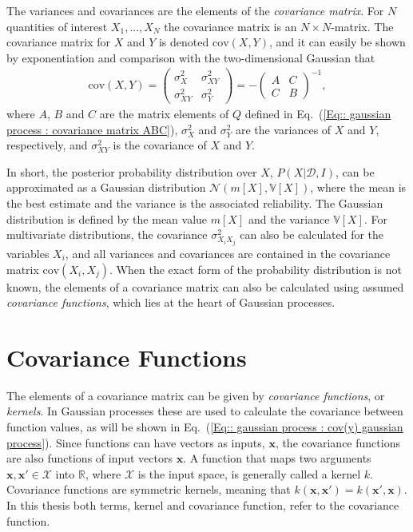 \documentclass[twoside,english]{uiofysmaster}
\begin{document}
{{The variances and covariances are the elements of the \textit{covariance matrix}. For $N$ quantities of interest $X_1, ...,X_N$ the covariance matrix is an $N \times N$-matrix. The covariance matrix for $X$ and $Y$ is denoted $\text{cov}(X,Y)$, and it can easily be shown by exponentiation and comparison with the two-dimensional Gaussian that \cite{sivia2006data}
\begin{align}
\text{cov}(X,Y) = 
\begin{pmatrix}
\sigma_X^2 & \sigma_{XY}^2\\
\sigma_{XY}^2 & \sigma_Y^2
\end{pmatrix}
= - \begin{pmatrix}
A & C\\
C & B
\end{pmatrix}^{-1},
\end{align}
where $A$, $B$ and $C$ are the matrix elements of $Q$ defined in Eq.~(\ref{Eq:: gaussian process : covariance matrix ABC}),  $\sigma_X^2$ and $\sigma_Y^2$ are the variances of $X$ and $Y$, respectively, and $\sigma_{XY}^2$ is the covariance of $X$ and $Y$.

In short, the posterior probability distribution over $X$, $P(X | \mathcal{D}, I)$, can be approximated as a Gaussian distribution $\mathcal{N}(m[X], \mathbb{V}[X])$, where the mean is the best estimate and the variance is the associated reliability. The Gaussian distribution is defined by the mean value $m[X]$ and the variance $\mathbb{V}[X]$. For multivariate distributions, the covariance $\sigma_{X_i X_j}^2$ can also be calculated for the variables $X_i$, and all variances and covariances are contained in the covariance matrix $\text{cov}(X_i, X_j)$. When the exact form of the probability distribution is not known, the elements of a covariance matrix can also be calculated using assumed \textit{covariance functions}, which lies at the heart of Gaussian processes.



\section{Covariance Functions}\label{Sec:: gaussian processes : Covariance functions}


The elements of a covariance matrix can be given by \textit{covariance functions}, or \textit{kernels}. In Gaussian processes these are used to calculate the covariance between function values, as will be shown in Eq.~(\ref{Eq:: gaussian process : cov(y) gaussian process}). Since functions can have vectors as inputs, $\textbf{x}$, the covariance functions are also functions of input vectors $\textbf{x}$. A function that maps two arguments $\textbf{x},\textbf{x}' \in \mathcal{X}$ into $\mathbb{R}$, where $\mathcal{X}$ is the input space, is generally called a kernel $k$. Covariance functions are symmetric kernels, meaning that $k(\textbf{x}, \textbf{x}') = k(\textbf{x}', \textbf{x})$. In this thesis both terms, kernel and covariance function, refer to the covariance function. 


}}
\end{document}
